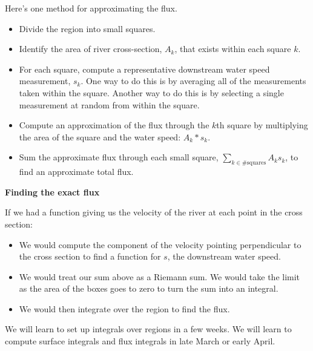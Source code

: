 \documentclass[12pt,letterpaper,noanswers]{exam}
\begin{document}
Here's one method for approximating the flux.
\begin{itemize}
\itemsep0em
    \item Divide the region into small squares.
    \item Identify the area of river cross-section, $A_k$, that exists within each square $k$.
    \item For each square, compute a representative downstream water speed measurement, $s_k$.  One way to do this is by averaging all of the measurements taken within the square.  Another way to do this is by selecting a single measurement at random from within the square.
    \item Compute an approximation of the flux through the $k$th square by multiplying the area of the square and the water speed: $A_k*s_k$.
    \item Sum the approximate flux through each small square, $\sum_{k\in \# \text{squares}} A_ks_k$, to find an approximate total flux.
\end{itemize}

\noindent\textbf{Finding the exact flux}

If we had a function giving us the velocity of the river at each point in the cross section:
\begin{itemize}
\itemsep0em
    \item We would compute the component of the velocity pointing perpendicular to the cross section to find a function for $s$, the downstream water speed.
    \item We would treat our sum above as a Riemann sum.  We would take the limit as the area of the boxes goes to zero to turn the sum into an integral.
    \item We would then integrate over the region to find the flux.
\end{itemize}

We will learn to set up integrals over regions in a few weeks.  We will learn to compute surface integrals and flux integrals in late March or early April.
\end{document}
